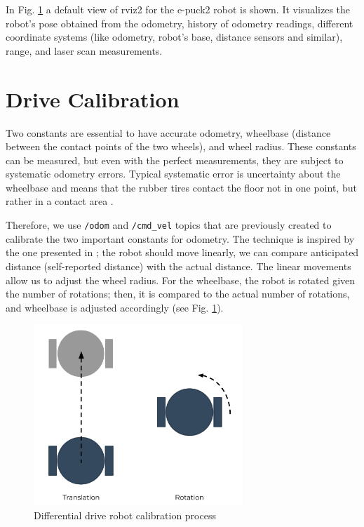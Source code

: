 In Fig. \ref{fig:demos:rviz} a default view of \acs{rviz2} for the e-puck2 robot is shown. It visualizes the robot's pose obtained from the odometry, history of odometry readings, different coordinate systems (like odometry, robot's base, distance sensors and similar), range, and laser scan measurements.

\section{Drive Calibration}

Two constants are essential to have accurate odometry, wheelbase (distance between the contact points of the two wheels), and wheel radius. These constants can be measured, but even with the perfect measurements, they are subject to systematic odometry errors. Typical systematic error is uncertainty about the wheelbase and means that the rubber tires contact the floor not in one point, but rather in a contact area \cite{borenstein_measurement_1996}.

Therefore, we use \texttt{/odom} and \texttt{/cmd\_vel} topics that are previously created to calibrate the two important constants for odometry. The technique is inspired by the one presented in \cite{borenstein_measurement_1996}; the robot should move linearly, we can compare anticipated distance (self-reported distance) with the actual distance. The linear movements allow us to adjust the wheel radius. For the wheelbase, the robot is rotated given the number of rotations; then, it is compared to the actual number of rotations, and wheelbase is adjusted accordingly (see Fig. \ref{fig:demos:rviz}).

\begin{figure}[H]
    \centering
    \includegraphics[width=0.7\textwidth]{demos/figures/calibration.pdf}
    \caption{Differential drive robot calibration process}
    \label{fig:demos:rviz}
\end{figure}

